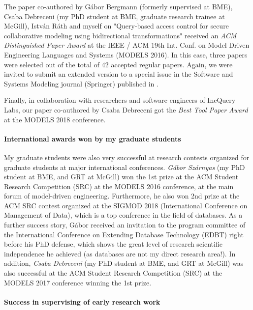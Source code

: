 The paper co-authored by Gábor Bergmann (formerly supervised at BME), Csaba Debreceni (my PhD student at BME, graduate research trainee at McGill), István Ráth and myself on "Query-based access control for secure collaborative modeling using bidirectional transformations" \cite{MODELS2016-access} received an \emph{ACM Distinguished Paper Award} at the IEEE / ACM 19th Int. Conf. on Model Driven Engineering Languages and Systems (MODELS 2016). In this case, three papers were selected out of the total of 42 accepted regular papers. Again, we were invited to submit an extended version to a special issue in the Software and Systems Modeling journal (Springer)
published in \cite{sosym2017-mondo}.

Finally, in collaboration with researchers and software engineers of IncQuery Labs, our paper \cite{models2018-tool} co-authored by Csaba Debreceni got the \emph{Best Tool Paper Award} at the MODELS 2018 conference.

\paragraph{International awards won by my graduate students}

My graduate students were also very successful at research contests organized for graduate students at major international conferences.  \emph{Gábor Szárnyas} (my PhD student at BME,  and GRT at McGill) won the 1st prize at the ACM Student Research Competition (SRC) at the MODELS 2016 conference, at the main forum of model-driven engineering. Furthermore, he also won 2nd prize at the ACM SRC contest organized at the SIGMOD 2018 (International Conference on Management of Data), which is a top conference in the field of databases. As a further success story, Gábor received an invitation to the program committee of the International Conference on Extending Database Technology (EDBT) right before his PhD defense, which shows the great level of research scientific independence he achieved (as databases are not my direct research area!). 
In addition, \emph{Csaba Debreceni} (my PhD student at BME,  and GRT at McGill) was also successful at the ACM Student Research Competition (SRC) at the MODELS 2017 conference winning the 1st prize. 


\paragraph{Success in supervising of early research work}

